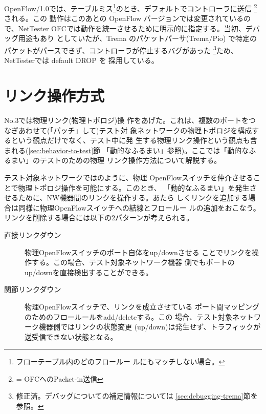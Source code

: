 OpenFlow/1.0では、テーブルミス\footnote{フローテーブル内のどのフロールー
ルにもマッチしない場合。}のとき、デフォルトでコントローラに送信
\footnote{ = OFCへのPacket-in送信}される。この
動作はこのあとの OpenFlow バージョンでは変更されているので、NetTester
OFCでは動作を統一させるために明示的に指定する。当初、デバッグ用途もあり
としていたが、Trema のパケットパーサ(Trema/Pio)
で特定のパケットがパースできず、コントローラが停止するバグがあった
\footnote{修正済。デバッグについての補足情報については
\ref{sec:debugging-trema}節を参照。}ため、NetTesterでは default DROP を
採用している。

  \section{リンク操作方式}
  \label{sec:link-operation}



 No.3では物理リンク(物理トポロジ)操
作をあげた。これは、複数のポートをつなぎあわせて(「パッチ」して)テスト対
象ネットワークの物理トポロジを構成するという観点だけでなく、テスト中に発
生する物理リンク操作という観点も含まれる(\ref{sec:behavior-to-test}節
「動的なふるまい」参照)。ここでは「動的なふるまい」のテストのための物理
リンク操作方法について解説する。

テスト対象ネットワークではのように、物理
OpenFlowスイッチを仲介させることで物理トポロジ操作を可能にする。このとき、
「動的なふるまい」を発生させるために、NW機器間のリンクを操作する。あたら
しくリンクを追加する場合は同様に物理OpenFlowスイッチへの結線とフロールー
ルの追加をおこなう。リンクを削除する場合には以下の2パターンが考えられる。
\begin{description}
 \item[直接リンクダウン] 物理OpenFlowスイッチのポート自体をup/downさせる
            ことでリンクを操作する。この場合、テスト対象ネットワーク機器
            側でもポートのup/downを直接検出することができる。
 \item[関節リンクダウン] 物理OpenFlowスイッチで、リンクを成立させている
            ポート間マッピングのためのフロールールをadd/deleteする。この
            場合、テスト対象ネットワーク機器側ではリンクの状態変更
            (up/down)は発生せず、トラフィックが送受信できない状態となる。
\end{description}

